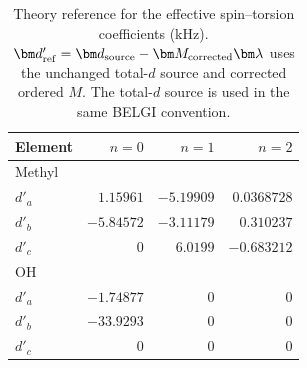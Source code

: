 \begin{table}\centering
\caption{Theory reference for the effective spin--torsion coefficients (kHz). $\bm d^{\prime}_{\rm ref}=\bm d_{\rm source}-\bm M_{\rm corrected}\bm\lambda$ uses the unchanged total-$d$ source and corrected ordered $M$. The total-$d$ source is used in the same BELGI convention.}
\label{tab:theory-st}
\small\begin{tabular}{lrrr}\toprule
Element & $n=0$ & $n=1$ & $n=2$\\\midrule
\multicolumn{4}{l}{Methyl}\\
$d'_{a}$ & $1.15961$ & $-5.19909$ & $0.0368728$\\
$d'_{b}$ & $-5.84572$ & $-3.11179$ & $0.310237$\\
$d'_{c}$ & $0$ & $6.0199$ & $-0.683212$\\
\midrule
\multicolumn{4}{l}{OH}\\
$d'_{a}$ & $-1.74877$ & $0$ & $0$\\
$d'_{b}$ & $-33.9293$ & $0$ & $0$\\
$d'_{c}$ & $0$ & $0$ & $0$\\
\bottomrule\end{tabular}
\end{table}
